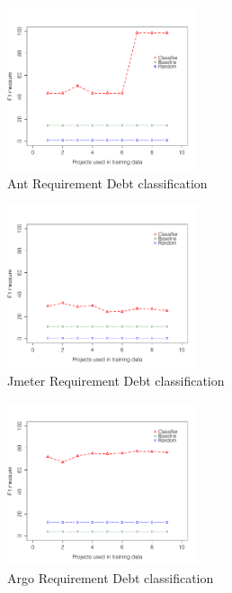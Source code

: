 \clearpage
 
\begin{figure}[thb!]
  \centering
  \includegraphics[width=0.50\textwidth]{figures/implementation_ant.pdf}
  \vspace{-3mm}
  \caption{Ant Requirement Debt classification}
  \label{fig:implementation_ant}
\end{figure}

\begin{figure}[thb!]
  \centering
  \includegraphics[width=0.50\textwidth]{figures/implementation_jmeter.pdf}
  \vspace{-3mm}
  \caption{Jmeter Requirement Debt classification}
  \label{fig:implementation_jmeter}
\end{figure}

\begin{figure}[thb!]
  \centering
  \includegraphics[width=0.50\textwidth]{figures/implementation_argo.pdf}
  \vspace{-3mm}
  \caption{Argo Requirement Debt classification}
  \label{fig:implementation_argo}
\end{figure}

